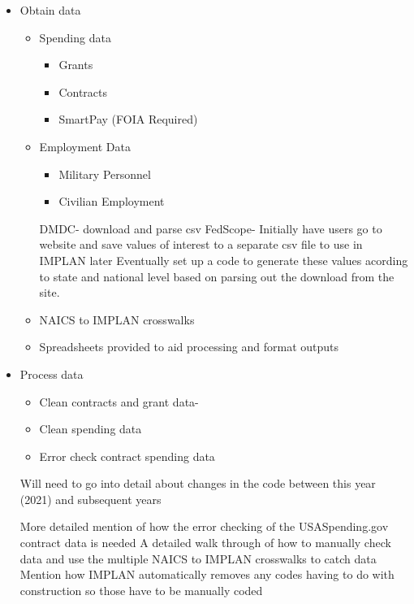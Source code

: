 \documentclass[
]{book}
\providecommand{\tightlist}{%
  \setlength{\itemsep}{0pt}\setlength{\parskip}{0pt}}
\begin{document}
\begin{itemize}
\item
  Obtain data

  \begin{itemize}
  \item
    Spending data

    \begin{itemize}
    \tightlist
    \item
      Grants
    \item
      Contracts
    \item
      SmartPay (FOIA Required)
    \end{itemize}
  \item
    Employment Data

    \begin{itemize}
    \tightlist
    \item
      Military Personnel
    \item
      Civilian Employment
    \end{itemize}

    DMDC- download and parse csv
    FedScope- Initially have users go to website and save values of interest to a separate csv file to use in IMPLAN later
    Eventually set up a code to generate these values acording to state and national level based on parsing out the download from
    the site.
  \item
    NAICS to IMPLAN crosswalks
  \item
    Spreadsheets provided to aid processing and format outputs
  \end{itemize}
\item
  Process data

  \begin{itemize}
  \tightlist
  \item
    Clean contracts and grant data-
  \item
    Clean spending data
  \item
    Error check contract spending data
  \end{itemize}

  Will need to go into detail about changes in the code between this year (2021) and subsequent years

  More detailed mention of how the error checking of the USASpending.gov contract data is needed
  A detailed walk through of how to manually check data and use the multiple NAICS to IMPLAN crosswalks to catch data
  Mention how IMPLAN automatically removes any codes having to do with construction so those have to be manually coded


\end{itemize}
\end{document}
